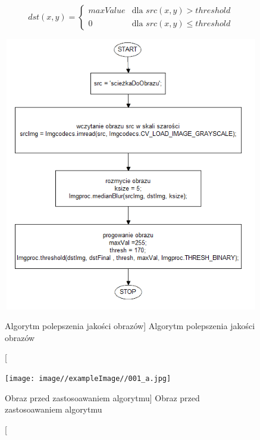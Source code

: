 \documentclass[a4paper,12pt]{article}
\begin{document}
			    \begin{displaymath}
                    dst( x, y) =  
                    \left\{
                        \begin{array}{ll}
                            maxValue & \textrm{dla } src( x, y) > threshold \\
                            0 & \textrm{dla } src( x, y) \leqslant threshold
                        \end{array}
                    \right.
                \end{displaymath}
			    
			    \newpage
    		    
    		    \begin{figure}[!ht]  
    			    \begin{center}
    				    \includegraphics[width=12cm, height=12cm] {image//algorithm//improveImg.png} 
    			    \end{center}
    			    \caption
        			    [Algorytm polepszenia jakości obrazów]  
	    		        {Algorytm polepszenia jakości obrazów}  
    		    \end{figure}
		
		
    		    \begin{figure}[!ht]  
    			    \begin{center}
    				    \texttt{[image: image//exampleImage//001\_a.jpg]} 
    			    \end{center}
    			    \caption
        			    [Obraz przed zastosoawaniem algorytmu]  
                        {Obraz przed zastosoawaniem algorytmu}  
    		    \end{figure}
		
\end{document}
